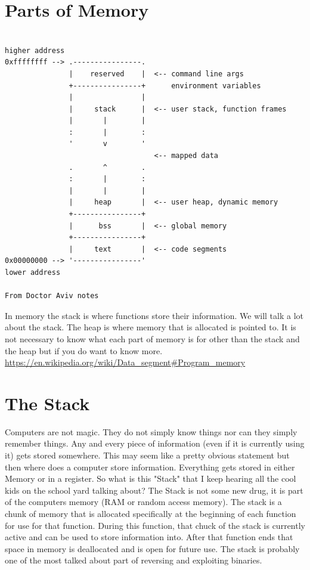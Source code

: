 \documentclass{report}
\begin{document}
\section{Parts of Memory}
\begin{verbatim}

higher address
0xffffffff --> .----------------.
               |    reserved    |  <-- command line args
               +----------------+      environment variables
               |                |
               |     stack      |  <-- user stack, function frames
               |       |        |
               :       |        :
               '       v        '
                                   <-- mapped data
               .       ^        .
               :       |        :
               |       |        |
               |     heap       |  <-- user heap, dynamic memory
               +----------------+
               |      bss       |  <-- global memory 
               +----------------+
               |     text       |  <-- code segments
0x00000000 --> '----------------'
lower address

From Doctor Aviv notes
\end{verbatim}
In memory the stack is where functions store their information.  We will talk a lot about the stack.  The heap is where memory that is allocated is pointed to.
It is not necessary to know what each part of memory is for other than the stack and the heap but if you do want to know more.
\url{https://en.wikipedia.org/wiki/Data_segment#Program_memory}

\section{The Stack}
Computers are not magic.  They do not simply know things nor can they simply remember things.  Any and every piece of information (even if it is currently using it) gets stored somewhere.  This may seem like a pretty obvious statement but then where does a computer store information.  Everything gets stored in either Memory or in a register.  So what is this "Stack" that I keep hearing all the cool kids on the school yard talking about?  The Stack is not some new drug, it is part of the computers memory (RAM or random access memory).  The stack is a chunk of memory that is allocated specifically at the beginning of each function for use for that function.  During this function, that chuck of the stack is currently active and can be used to store information into.  After that function ends that space in memory is deallocated and is open for future use.  The stack is probably one of the most talked about part of reversing and exploiting binaries.
\end{document}
